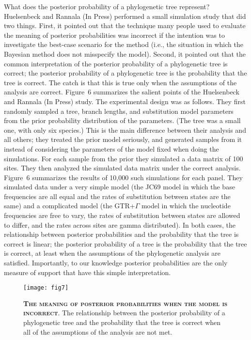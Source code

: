 \documentclass{svmult}
\begin{document}
What does the  posterior probability of a phylogenetic tree represent?
Huelsenbeck and Rannala (In Press) performed a small simulation study that did two things. First, it pointed out that the technique many people used to
evaluate the meaning of posterior probabilities was incorrect if the intention was to investigate the best-case scenario for the method (i.e., the situation in
which the Bayesian method does not misspecify the model). Second, it pointed out that the common interpretation of the posterior probability of a phylogenetic
tree is correct; the posterior probability of a phylogenetic tree is the probability that the tree is correct. The catch is that this is true only when the assumptions of the
analysis are correct. Figure~6 summarizes the salient points of the Huelsenbeck and Rannala (In Press) study. The experimental design was as follows. They first
randomly sampled a tree, branch lengths, and substitution model parameters from the prior probability distribution of the parameters. (The tree was a small one, with only
six species.) This is the main difference
between their analysis and all others; they treated the prior model seriously, and generated samples from it instead of considering the parameters of the model fixed
when doing the simulations. For each sample from the prior they simulated a data matrix of 100 sites. They then analyzed the simulated data matrix under the correct
analysis. Figure~6 summarizes the results of 10,000 such simulations for each panel. They simulated data under a very simple model (the JC69 model in which
the base frequencies are all equal and the rates of substitution between states are the same) and a complicated model (the GTR+$\Gamma$ model in which the nucleotide frequencies are free to vary, the rates of substitution between states are allowed to differ, and the rates across sites are gamma distributed). In both
cases, the relationship between posterior probabilities and the probability that the tree is correct is linear; the posterior probability of a tree is the probability that
the tree is correct, at least when the assumptions of the phylogenetic analysis are satisfied. Importantly, to our knowledge posterior probabilities are the only measure
of support that have this simple interpretation.

\begin{figure}[t]
\centering
\texttt{[image: fig7]}
\caption{\textbf{\textsc{The meaning of posterior probabilities when the model is incorrect}}.
The relationship between the posterior probability of a phylogenetic tree and the probability that the tree is correct when all of the assumptions of
the analysis are not met. }
\label{fig7}
\end{figure}
\end{document}
